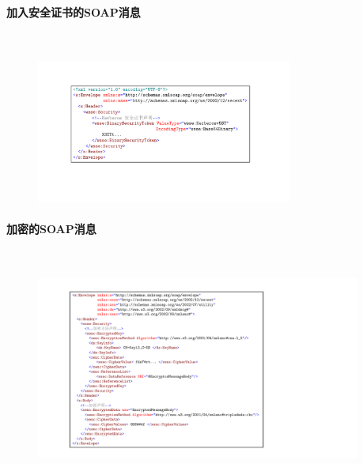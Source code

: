 \paragraph*{加入安全证书的SOAP消息}~{} \par
\begin{figure}[H]
    \vspace{-0.5em}
	\centering
	\includegraphics[width=0.75\textwidth]{images/加入安全证书的SOAP消息.pdf}
    \vspace{-1.5em}
\end{figure}

\paragraph*{加密的SOAP消息}~{} \par
\begin{figure}[H]
    \vspace{-0.5em}
	\centering
	\includegraphics[width=0.95\textwidth]{images/加密的SOAP消息.pdf}
    \vspace{-1.5em}
\end{figure}


